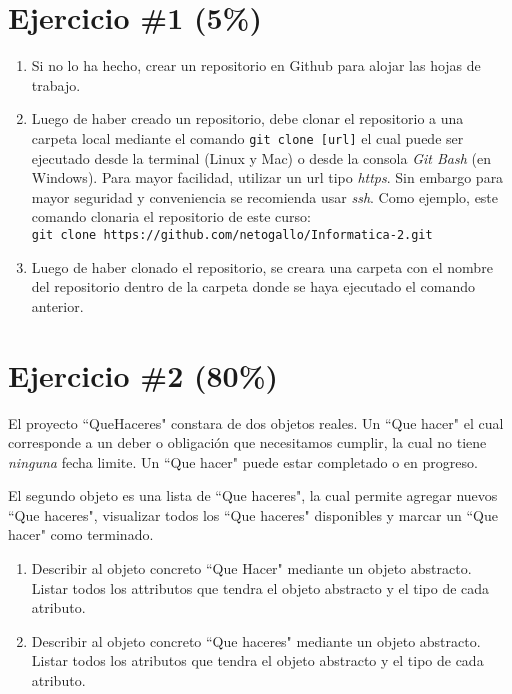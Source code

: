 \documentclass{article}
\begin{document}
    \section*{Ejercicio \#1 (5\%)}
    \begin{enumerate}
            \item{
                    Si no lo ha hecho, crear un repositorio en Github para alojar
                    las hojas de trabajo.}
            \item{
                    Luego de haber creado un repositorio, debe clonar el repositorio
                    a una carpeta local mediante el comando \texttt{git clone [url]} el cual
                    puede ser ejecutado desde la terminal (Linux y Mac) o desde la consola
                    \emph{Git Bash} (en Windows). Para mayor
                    facilidad, utilizar un url tipo \emph{https}. Sin embargo para mayor
                    seguridad y conveniencia se recomienda usar \emph{ssh}\cite{GithubSsh}.
                    Como ejemplo, este comando clonaria el repositorio de este curso: \\
                    \texttt{git clone https://github.com/netogallo/Informatica-2.git}
            }
            \item{
                    Luego de haber clonado el repositorio, se creara una carpeta
                    con el nombre del repositorio dentro de la carpeta donde se
                    haya ejecutado el comando anterior.
            }
    \end{enumerate}
    
    \section*{Ejercicio \#2 (80\%)}
    El proyecto ``QueHaceres" constara de dos objetos reales. Un
    ``Que hacer" el cual corresponde a un deber o obligaci\'on que
    necesitamos cumplir, la cual no tiene \emph{ninguna} fecha limite.
    Un ``Que hacer" puede estar completado o en progreso.
    
    El segundo objeto es una lista de ``Que haceres", la cual permite agregar
    nuevos ``Que haceres", visualizar todos los ``Que haceres" disponibles y
    marcar un ``Que hacer" como terminado.
    
    \begin{enumerate}
            \item{
                    Describir al objeto concreto ``Que Hacer" mediante un objeto
                    abstracto. Listar todos los attributos que tendra el objeto
                    abstracto y el tipo de cada atributo.}
            \item{
                    Describir al objeto concreto ``Que haceres" mediante un objeto
                    abstracto. Listar todos los atributos que tendra el objeto abstracto
                    y el tipo de cada atributo.
            }
    \end{enumerate}
    
\end{document}
